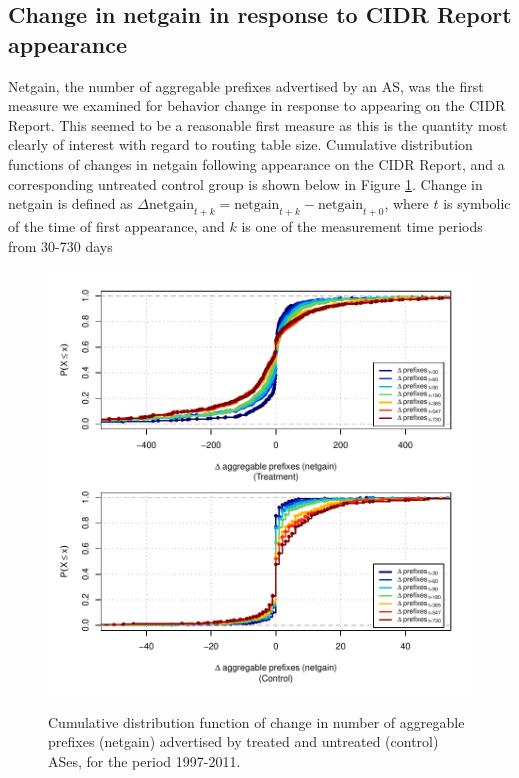 \subsection{Change in netgain in response to CIDR Report appearance}

Netgain, the number of aggregable prefixes advertised by an AS, was the first
measure we examined for behavior change in response to appearing on the CIDR
Report. This seemed to be a reasonable first measure as this is the quantity
most clearly of interest with regard to routing table size. Cumulative
distribution functions of changes in netgain following appearance on the CIDR
Report, and a corresponding untreated control group is shown below in Figure
\ref{fig:delta_netgain_cdf}. Change in netgain is defined as
$\Delta\textrm{netgain}_{t+k} = \textrm{netgain}_{t+k} -
\textrm{netgain}_{t+0}$, where $t$ is symbolic of the time of first appearance,
and $k$ is one of the measurement time periods from 30-730 days

\begin{figure}[h!]
\begin{centering}
\begin{singlespace}
    \includegraphics[width=6in]{figures/behavior-netgain-1997_2011-corr.pdf}
    \vspace{-2em}\\
    \caption{Cumulative distribution function of change in number of aggregable
    prefixes (netgain) advertised by treated and untreated (control) ASes, for
    the period 1997-2011.}
    \label{fig:delta_netgain_cdf}
\end{singlespace}
\end{centering}
\end{figure}

